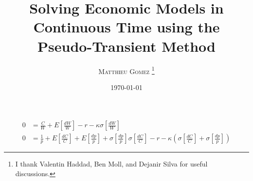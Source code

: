 \documentclass[english]{article}
\begin{document}
	\title{Solving Economic Models in Continuous Time using the Pseudo-Transient Method}
	\author{\large{\textsc{Matthieu Gomez \thanks{I thank Valentin Haddad, Ben Moll, and Dejanir Silva for useful discussions.}}}}
	\date{\today}
	\maketitle
	\begin{align*}
		0&=\frac{C}{W} + E[\frac{dW}{W}] - r - \kappa \sigma[\frac{dW}{W}]\\
		0&=\frac{1}{p} + E[\frac{dC}{C}] +E[\frac{dp}{p}] + \sigma[\frac{dp}{p}]\sigma[\frac{dC}{C}] - r - \kappa (\sigma[\frac{dC}{C}] +\sigma[\frac{dp}{p}])
	\end{align*}
\end{document}
